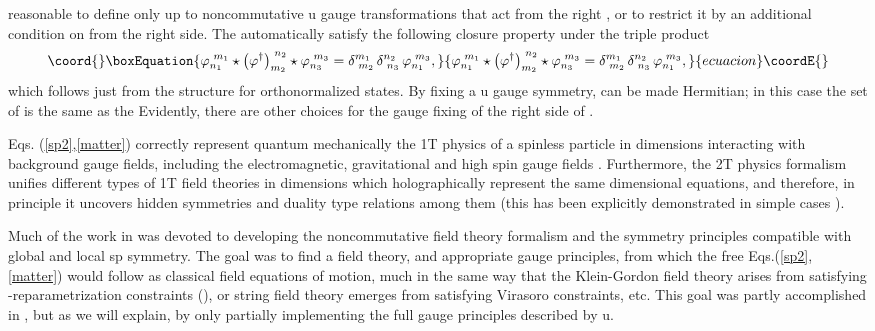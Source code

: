 \documentclass[a4paper,12pt]{article}
\begin{document}
reasonable to define \myHighlight{$\varphi $}\coordHE{} only up to noncommutative u\coordHE{} gauge transformations that act from the right \coordHE{}%
, or to restrict it by an additional condition on \myHighlight{$\varphi $}\coordHE{} from the right
side. The \coordHE{} automatically satisfy the following closure
property under the triple product 
\begin{equation}\coord{}\boxEquation{
\varphi _{n_{1}}^{\,\,m_{1}}\star \left( \varphi ^{\dagger }\right)
_{m_{2}}^{\,\,n_{2}}\star \varphi _{n_{3}}^{\,\,m_{3}}=\delta
_{\,\,m_{2}}^{m_{1}}\,\delta _{\,\,n_{3}}^{n_{2}}\,\varphi
_{n_{1}}^{\,\,m_{3}},  \label{tripple}
}{
\varphi _{n_{1}}^{\,\,m_{1}}\star \left( \varphi ^{\dagger }\right)
_{m_{2}}^{\,\,n_{2}}\star \varphi _{n_{3}}^{\,\,m_{3}}=\delta
_{\,\,m_{2}}^{m_{1}}\,\delta _{\,\,n_{3}}^{n_{2}}\,\varphi
_{n_{1}}^{\,\,m_{3}},  }{ecuacion}\coordE{}\end{equation}
which follows just from the structure \coordHE{}
for orthonormalized states. By fixing a u\coordHE{}
gauge symmetry, \myHighlight{$\varphi $}\coordHE{} can be made Hermitian; in this case the set of \coordHE{} is the same as the \coordHE{}
Evidently, there are other choices for the gauge fixing of the right side of 
\myHighlight{$\varphi $}\coordHE{}.

Eqs. (\ref{sp2},\ref{matter}) correctly represent quantum mechanically the
1T physics of a spinless particle in \coordHE{} dimensions interacting with
background gauge fields, including the electromagnetic, gravitational and
high spin gauge fields \cite{NCSp}. Furthermore, the 2T physics formalism
unifies different types of 1T field theories in \coordHE{} dimensions which
holographically represent the same \coordHE{} dimensional equations, and
therefore, in principle it uncovers hidden symmetries and duality type
relations among them (this has been explicitly demonstrated in simple cases 
\cite{survey2T}).

Much of the work in \cite{NCSp} was devoted to developing the noncommutative
field theory formalism and the symmetry principles compatible with global
and local sp\coordHE{} symmetry. The goal was to find a field
theory, and appropriate gauge principles, from which the free Eqs.(\ref{sp2},%
\ref{matter}) would follow as classical field equations of motion, much in
the same way that the Klein-Gordon field theory arises from satisfying \myHighlight{$\tau 
$}\coordHE{}-reparametrization constraints (\coordHE{}), or string field theory emerges
from satisfying Virasoro constraints, etc. This goal was partly accomplished
in \cite{NCSp}, but as we will explain, by only partially implementing the
full gauge principles described by u\coordHE{}.
\end{document}
